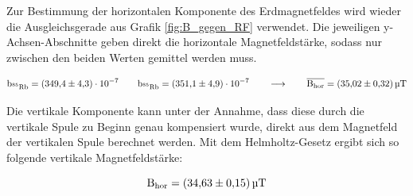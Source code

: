         Zur Bestimmung der horizontalen Komponente des Erdmagnetfeldes wird wieder die Ausgleichsgerade aus Grafik \autoref{fig:B_gegen_RF} verwendet. Die jeweiligen y-Achsen-Abschnitte geben direkt die 
        horizontale Magnetfeldstärke, sodass nur zwischen den beiden Werten gemittel werden muss.
        
        \begin{equation*}
            \text{b}_{\text{${}^{85}$Rb}}= \num{349.4\pm4.3 e-7} \qquad \text{b}_{\text{${}^{85}$Rb}}= \num{351.1\pm4.9 e-7} \qquad \longrightarrow \qquad  \overline{\text{B}_{\text{hor}}} = \SI{35.02 +- 0.32}{\micro\tesla}
        \end{equation*}
    
        \noindent

        Die vertikale Komponente kann unter der Annahme, dass diese durch die vertikale Spule zu Beginn genau kompensiert wurde, direkt aus dem Magnetfeld der vertikalen Spule berechnet werden. Mit dem 
        Helmholtz-Gesetz ergibt sich so folgende vertikale Magnetfeldstärke:

        \begin{equation*}
            \text{B}_{\text{hor}} = \SI{34.63 +- 0.15}{\micro\tesla}
        \end{equation*}

